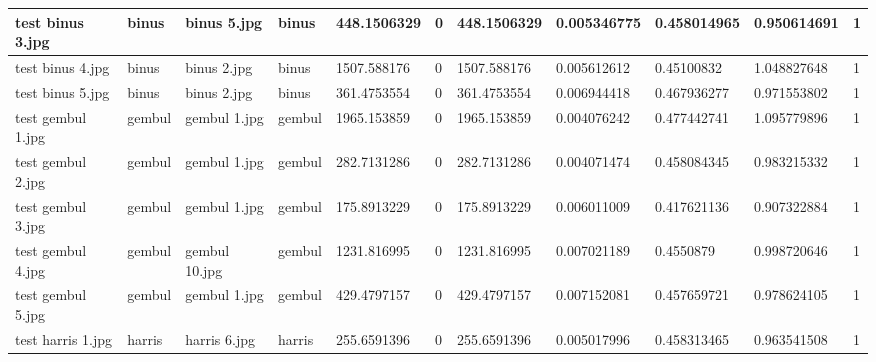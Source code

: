 \begin{landscape}
\begin{longtable}{|p{2cm}|p{1.5cm}|p{2cm}|p{1.5cm}|p{2cm}|p{1cm}|p{2cm}|p{2cm}|p{2cm}|p{2cm}|p{1cm}|}
		test binus 3.jpg     & binus            & binus 5.jpg           & binus                       & 448.1506329           & 0                       & 448.1506329                & 0.005346775           & 0.458014965           & 0.950614691              & 1                \\ \hline
		test binus 4.jpg     & binus            & binus 2.jpg           & binus                       & 1507.588176           & 0                       & 1507.588176                & 0.005612612           & 0.45100832            & 1.048827648              & 1                \\ \hline
		test binus 5.jpg     & binus            & binus 2.jpg           & binus                       & 361.4753554           & 0                       & 361.4753554                & 0.006944418           & 0.467936277           & 0.971553802              & 1                \\ \hline
		test gembul 1.jpg    & gembul           & gembul 1.jpg          & gembul                      & 1965.153859           & 0                       & 1965.153859                & 0.004076242           & 0.477442741           & 1.095779896              & 1                \\ \hline
		test gembul 2.jpg    & gembul           & gembul 1.jpg          & gembul                      & 282.7131286           & 0                       & 282.7131286                & 0.004071474           & 0.458084345           & 0.983215332              & 1                \\ \hline
		test gembul 3.jpg    & gembul           & gembul 1.jpg          & gembul                      & 175.8913229           & 0                       & 175.8913229                & 0.006011009           & 0.417621136           & 0.907322884              & 1                \\ \hline
		test gembul 4.jpg    & gembul           & gembul 10.jpg         & gembul                      & 1231.816995           & 0                       & 1231.816995                & 0.007021189           & 0.4550879             & 0.998720646              & 1                \\ \hline
		test gembul 5.jpg    & gembul           & gembul 1.jpg          & gembul                      & 429.4797157           & 0                       & 429.4797157                & 0.007152081           & 0.457659721           & 0.978624105              & 1                \\ \hline
		test harris 1.jpg    & harris           & harris 6.jpg          & harris                      & 255.6591396           & 0                       & 255.6591396                & 0.005017996           & 0.458313465           & 0.963541508              & 1                \\ \hline

\end{longtable}
\end{landscape}
